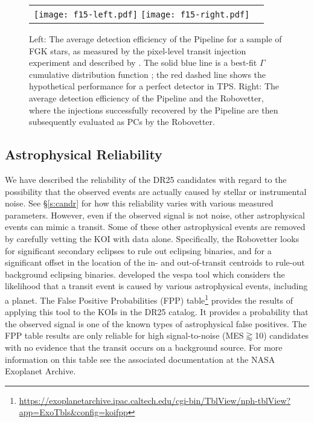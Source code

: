 \begin{figure*}[ht]
\centering
\hspace{-2.5em}\begin{tabular}{cc}
\texttt{[image: f15-left.pdf]} 
\texttt{[image: f15-right.pdf]}
\end{tabular}
\caption{Left: The average detection efficiency of the \Kepler{} Pipeline for a sample of FGK stars, as measured by the pixel-level transit injection experiment and described by \citet{Christiansen2017}. The solid blue line is a best-fit $\Gamma$ cumulative distribution function \citep[see Equation 1 of ][]{Christiansen2016}; the red dashed line shows the hypothetical performance for a perfect detector in TPS. Right: The average detection efficiency of the \Kepler{} Pipeline and the Robovetter, where the injections successfully recovered by the Pipeline are then subsequently evaluated as PCs by the Robovetter.}

\label{f:fulldetectionefficiency}

\end{figure*}


\subsection{Astrophysical Reliability}
We have described the reliability of the DR25 candidates with regard to the possibility that the observed events are actually caused by stellar or instrumental noise. See \S\ref{s:candr} for how this reliability varies with various measured parameters.  However, even if the observed signal is not noise, other astrophysical events can mimic a transit.  Some of these other astrophysical events are removed by carefully vetting the KOI with \Kepler{} data alone.  Specifically, the Robovetter looks for significant secondary eclipses to rule out eclipsing binaries, and for a significant offset in the location of the in- and out-of-transit centroids to rule-out background eclipsing binaries. \citet[][]{Morton2016} developed the vespa tool which considers the likelihood that a transit event is caused by various astrophysical events, including a planet.  The False Positive Probabilities (FPP) table\footnote{\url{https://exoplanetarchive.ipac.caltech.edu/cgi-bin/TblView/nph-tblView?app=ExoTbls&config=koifpp}} provides the results of applying this tool to the KOIs in the DR25 catalog. It provides a probability that the observed signal is one of the known types of astrophysical false positives.  The FPP table results are only reliable for high signal-to-noise (MES$\gtrapprox$10) candidates with no evidence that the transit occurs on a background source.  For more information on this table see the associated documentation at the NASA Exoplanet Archive.


